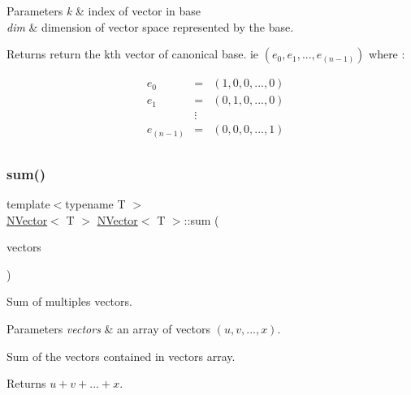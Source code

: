 \begin{DoxyParams}{Parameters}
{\em k} & index of vector in base \\
\hline
{\em dim} & dimension of vector space represented by the base. \\
\hline
\end{DoxyParams}
\begin{DoxyReturn}{Returns}
return the kth vector of canonical base. ie $ (e_{0}, e_{1}, ..., e_{(n-1)}) $ where \+:
\end{DoxyReturn}
\[ \begin{align*} & e_{0} &=& (1, 0, 0, ..., 0) \\ & e_{1} &=& (0, 1, 0, ..., 0) \\ & &\vdots & \\ &e_{(n - 1)} &=& (0, 0, 0, ..., 1) \\ \end{align*} \] \mbox{\label{class_n_vector_af0f5749405554fc23a0af67ad4f9e9e5}} 
\subsubsection{\texorpdfstring{sum()}{sum()}}
{\footnotesize\ttfamily template$<$typename T $>$ \\
\mbox{\hyperlink{class_n_vector}{N\+Vector}}$<$ T $>$ \mbox{\hyperlink{class_n_vector}{N\+Vector}}$<$ T $>$\+::sum (\begin{DoxyParamCaption}\item[{const std\+::vector$<$ \mbox{\hyperlink{class_n_vector}{N\+Vector}}$<$ T $>$ $>$ \&}]{vectors }\end{DoxyParamCaption})\hspace{0.3cm}{\ttfamily [static]}}



Sum of multiples vectors. 


\begin{DoxyParams}{Parameters}
{\em vectors} & an array of vectors $ (u, v, ..., x) $.\\
\hline
\end{DoxyParams}
Sum of the vectors contained in {\ttfamily vectors} array. \begin{DoxyReturn}{Returns}
$ u + v + ... + x $. 
\end{DoxyReturn}
\mbox{\label{class_n_vector_a89ea4dcaa84313e6446e0be35ec7bbe1}} 
